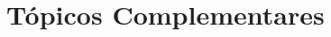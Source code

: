 \documentclass[xcolor={dvipsnames,table},aspectratio=169]{beamer}
\begin{document}

\section{Tópicos Complementares}
\end{document}
